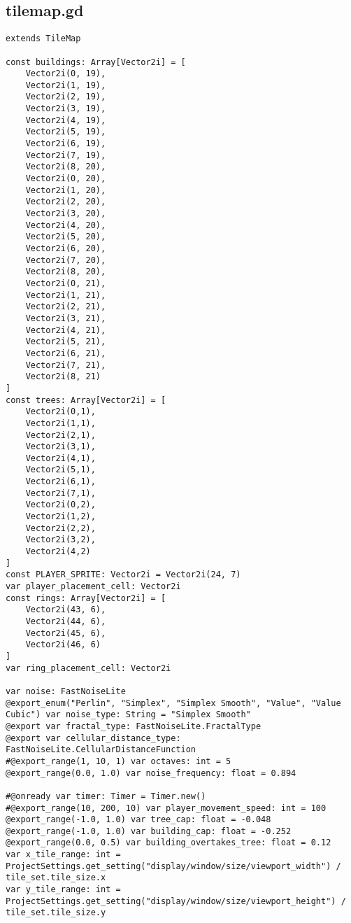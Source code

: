 \subsection{tile\textunderscore{}map.gd}

\begin{lstlisting}
extends TileMap

const buildings: Array[Vector2i] = [
	Vector2i(0, 19),
	Vector2i(1, 19),
	Vector2i(2, 19),
	Vector2i(3, 19),
	Vector2i(4, 19),
	Vector2i(5, 19),
	Vector2i(6, 19),
	Vector2i(7, 19),
	Vector2i(8, 20),
	Vector2i(0, 20),
	Vector2i(1, 20),
	Vector2i(2, 20),
	Vector2i(3, 20),
	Vector2i(4, 20),
	Vector2i(5, 20),
	Vector2i(6, 20),
	Vector2i(7, 20),
	Vector2i(8, 20),
	Vector2i(0, 21),
	Vector2i(1, 21),
	Vector2i(2, 21),
	Vector2i(3, 21),
	Vector2i(4, 21),
	Vector2i(5, 21),
	Vector2i(6, 21),
	Vector2i(7, 21),
	Vector2i(8, 21)
]
const trees: Array[Vector2i] = [
	Vector2i(0,1),
	Vector2i(1,1),
	Vector2i(2,1),
	Vector2i(3,1),
	Vector2i(4,1),
	Vector2i(5,1),
	Vector2i(6,1),
	Vector2i(7,1),
	Vector2i(0,2),
	Vector2i(1,2),
	Vector2i(2,2),
	Vector2i(3,2),
	Vector2i(4,2)
]
const PLAYER_SPRITE: Vector2i = Vector2i(24, 7)
var player_placement_cell: Vector2i
const rings: Array[Vector2i] = [
	Vector2i(43, 6),
	Vector2i(44, 6),
	Vector2i(45, 6),
	Vector2i(46, 6)
]
var ring_placement_cell: Vector2i

var noise: FastNoiseLite
@export_enum("Perlin", "Simplex", "Simplex Smooth", "Value", "Value Cubic") var noise_type: String = "Simplex Smooth"
@export var fractal_type: FastNoiseLite.FractalType
@export var cellular_distance_type: FastNoiseLite.CellularDistanceFunction
#@export_range(1, 10, 1) var octaves: int = 5 
@export_range(0.0, 1.0) var noise_frequency: float = 0.894

#@onready var timer: Timer = Timer.new()
#@export_range(10, 200, 10) var player_movement_speed: int = 100 
@export_range(-1.0, 1.0) var tree_cap: float = -0.048
@export_range(-1.0, 1.0) var building_cap: float = -0.252
@export_range(0.0, 0.5) var building_overtakes_tree: float = 0.12
var x_tile_range: int = ProjectSettings.get_setting("display/window/size/viewport_width") / tile_set.tile_size.x
var y_tile_range: int = ProjectSettings.get_setting("display/window/size/viewport_height") / tile_set.tile_size.y


\end{lstlisting}
